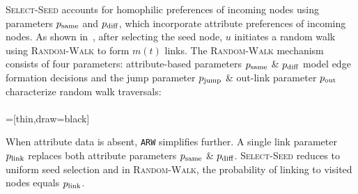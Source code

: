 \textsc{Select-Seed} accounts for homophilic preferences of incoming nodes using
parameters $p_{\scriptsize\mbox{same}}$ and $p_{\scriptsize\mbox{diff}}$, which incorporate attribute preferences of incoming nodes.
As shown in~, after selecting
the seed node, $u$ initiates a
random walk using \textsc{Random-Walk} to form $m(t)$ links.
The \textsc{Random-Walk} mechanism consists of four parameters: attribute-based parameters
$p_{\scriptsize\mbox{same}}$ \& $p_{\scriptsize\mbox{diff}}$ model edge formation decisions and the jump parameter $p_{\scriptsize\mbox{jump}}$ \&
out-link parameter $p_{\scriptsize\mbox{out}}$ characterize random walk traversals:
\\\\
=[thin,draw=black]

When attribute data is absent, \texttt{ARW} simplifies further. A single link parameter $p_{\scriptsize\mbox{link}}$ replaces both attribute parameters $p_{\scriptsize\mbox{same}}$ \& $p_{\scriptsize\mbox{diff}}$.
\textsc{Select-Seed} reduces to uniform seed selection and in
\textsc{Random-Walk}, the probability of linking to visited nodes equals $p_{\scriptsize\mbox{link}}$.



